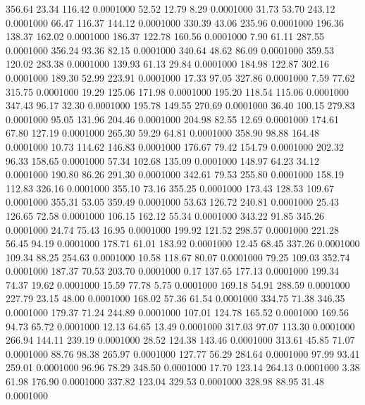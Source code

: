  356.64   23.34  116.42   0.0001000
  52.52   12.79    8.29   0.0001000
  31.73   53.70  243.12   0.0001000
  66.47  116.37  144.12   0.0001000
 330.39   43.06  235.96   0.0001000
 196.36  138.37  162.02   0.0001000
 186.37  122.78  160.56   0.0001000
   7.90   61.11  287.55   0.0001000
 356.24   93.36   82.15   0.0001000
 340.64   48.62   86.09   0.0001000
 359.53  120.02  283.38   0.0001000
 139.93   61.13   29.84   0.0001000
 184.98  122.87  302.16   0.0001000
 189.30   52.99  223.91   0.0001000
  17.33   97.05  327.86   0.0001000
   7.59   77.62  315.75   0.0001000
  19.29  125.06  171.98   0.0001000
 195.20  118.54  115.06   0.0001000
 347.43   96.17   32.30   0.0001000
 195.78  149.55  270.69   0.0001000
  36.40  100.15  279.83   0.0001000
  95.05  131.96  204.46   0.0001000
 204.98   82.55   12.69   0.0001000
 174.61   67.80  127.19   0.0001000
 265.30   59.29   64.81   0.0001000
 358.90   98.88  164.48   0.0001000
  10.73  114.62  146.83   0.0001000
 176.67   79.42  154.79   0.0001000
 202.32   96.33  158.65   0.0001000
  57.34  102.68  135.09   0.0001000
 148.97   64.23   34.12   0.0001000
 190.80   86.26  291.30   0.0001000
 342.61   79.53  255.80   0.0001000
 158.19  112.83  326.16   0.0001000
 355.10   73.16  355.25   0.0001000
 173.43  128.53  109.67   0.0001000
 355.31   53.05  359.49   0.0001000
  53.63  126.72  240.81   0.0001000
  25.43  126.65   72.58   0.0001000
 106.15  162.12   55.34   0.0001000
 343.22   91.85  345.26   0.0001000
  24.74   75.43   16.95   0.0001000
 199.92  121.52  298.57   0.0001000
 221.28   56.45   94.19   0.0001000
 178.71   61.01  183.92   0.0001000
  12.45   68.45  337.26   0.0001000
 109.34   88.25  254.63   0.0001000
  10.58  118.67   80.07   0.0001000
  79.25  109.03  352.74   0.0001000
 187.37   70.53  203.70   0.0001000
   0.17  137.65  177.13   0.0001000
 199.34   74.37   19.62   0.0001000
  15.59   77.78    5.75   0.0001000
 169.18   54.91  288.59   0.0001000
 227.79   23.15   48.00   0.0001000
 168.02   57.36   61.54   0.0001000
 334.75   71.38  346.35   0.0001000
 179.37   71.24  244.89   0.0001000
 107.01  124.78  165.52   0.0001000
 169.56   94.73   65.72   0.0001000
  12.13   64.65   13.49   0.0001000
 317.03   97.07  113.30   0.0001000
 266.94  144.11  239.19   0.0001000
  28.52  124.38  143.46   0.0001000
 313.61   45.85   71.07   0.0001000
  88.76   98.38  265.97   0.0001000
 127.77   56.29  284.64   0.0001000
  97.99   93.41  259.01   0.0001000
  96.96   78.29  348.50   0.0001000
  17.70  123.14  264.13   0.0001000
   3.38   61.98  176.90   0.0001000
 337.82  123.04  329.53   0.0001000
 328.98   88.95   31.48   0.0001000
